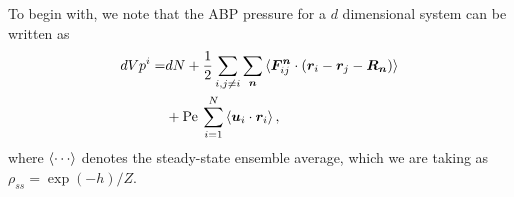 \documentclass[twocolumn,amsmath,amssymb,aps]{revtex4-1}%
\begin{document}
To begin with, we note that the ABP pressure for a $d$ dimensional
system can be written as
\begin{align}
  dVp^i=&
  dN + \frac{1}{2}\sum_{i,j\neq i}\sum_{\bm{n}}
  \braket{\bm{F}_{ij}^{\bm{n}}\cdot(\bm{r}_i-\bm{r}_j-\bm{R}_{\bm{n}})}
  \nonumber\\
  &+\mathrm{Pe}\:\sum_{i=1}^N\braket{\bm{u}_i\cdot\bm{r}_i},
\end{align}
where $\braket{\cdots}$ denotes the steady-state ensemble average,
which we are taking as $\rho_{ss}=\exp(-h)/Z$.






\end{document}
